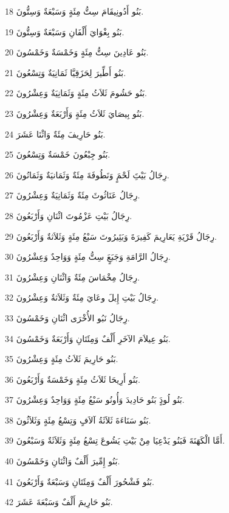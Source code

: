 \par 18 بَنُو أَدُونِيقَامَ سِتُّ مِئَةٍ وَسَبْعَةٌ وَسِتُّونَ.
\par 19 بَنُو بِغْوَايَ أَلْفَانِ وَسَبْعَةٌ وَسِتُّونَ.
\par 20 بَنُو عَادِينَ سِتُّ مِئَةٍ وَخَمْسَةٌ وَخَمْسُونَ.
\par 21 بَنُو أَطِّيرَ لِحَزَقِيَّا ثَمَانِيَةٌ وَتِسْعُونَ.
\par 22 بَنُو حَشُومَ ثَلاَثُ مِئَةٍ وَثَمَانِيَةٌ وَعِشْرُونَ.
\par 23 بَنُو بِيصَايَ ثَلاَثُ مِئَةٍ وَأَرْبَعَةٌ وَعِشْرُونَ.
\par 24 بَنُو حَارِيفَ مِئَةٌ وَاثْنَا عَشَرَ.
\par 25 بَنُو جِبْعُونَ خَمْسَةٌ وَتِسْعُونَ.
\par 26 رِجَالُ بَيْتَِ لَحْمٍَ وَنَطُوفَةَ مِئَةٌ وَثَمَانيَةٌ وَثَمَانُونَ.
\par 27 رِجَالُ عَنَاثُوثَ مِئَةٌ وَثَمَانِيَةٌ وَعِشْرُونَ.
\par 28 رِجَالُ بَيْتِ عَزْمُوتَ اثْنَانِ وَأَرْبَعُونَ.
\par 29 رِجَالُ قَرْيَةِ يَعَارِيمَ كَفِيرَةَ وَبَئِيرُوتَ سَبْعُ مِئَةٍ وَثَلاَثةٌ وَأَرْبَعُونَ.
\par 30 رِجَالُ الرَّامَةِ وَجَبَعٍَ سِتُّ مِئَةٍ وَوَاحِدٌ وَعِشْرُونَ.
\par 31 رِجَالُ مِخْمَاسَ مِئَةٌ وَاثْنَانِ وَعِشْرُونَ.
\par 32 رِجَالُ بَيْتِ إِيلَ وعَايَ مِئَةٌ وَثَلاَثةٌ وَعِشْرُونَ.
\par 33 رِجَالُ نَبُو الأُخْرَى اثْنَانِ وَخَمْسُونَ.
\par 34 بَنُو عِيلاَمَ الآخَرِ أَلْفٌ وَمِئَتَانِ وَأَرْبَعَةٌ وَخَمْسُونَ.
\par 35 بَنُو حَارِيمَ ثَلاَثُ مِئَةٍ وَعِشْرُونَ.
\par 36 بَنُو أَرِيحَا ثَلاَثُ مِئَةٍ وَخَمْسَةٌ وَأَرْبَعُونَ.
\par 37 بَنُو لُودٍَ بَنُو حَادِيدَ وَأُونُو سَبْعُ مِئَةٍ وَوَاحِدٌ وَعِشْرُونَ.
\par 38 بَنُو سَنَاءَةَ ثَلاَثَةُ آلاَفٍ وَتِسْعُ مِئَةٍ وَثَلاَثُونَ.
\par 39 أَمَّا الْكَهَنَةَ فَبَنُو يَدْعِيَا مِنْ بَيْتِ يَشُوعَ تِسْعُ مِئَةٍ وَثَلاَثَةٌ وَسَبْعُونَ.
\par 40 بَنُو إِمِّيرَ أَلْفٌ وَاثْنَانِ وَخَمْسُونَ.
\par 41 بَنُو فَشْحُورَ أَلْفٌ وَمِئَتَانِ وَسَبْعَةٌ وَأَرْبَعُونَ.
\par 42 بَنُو حَارِيمَ أَلْفٌ وَسَبْعَةَ عَشَرَ.
